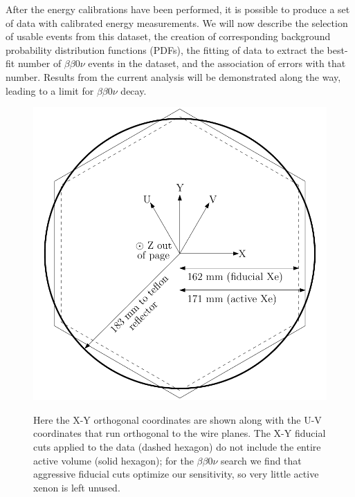 After the energy calibrations have been performed, it is possible to produce a set of data with calibrated energy measurements.  We will now describe the selection of usable events from this dataset, the creation of corresponding background probability distribution functions (PDFs), the fitting of data to extract the best-fit number of $\beta\beta 0\nu$ events in the dataset, and the association of errors with that number.  Results from the current analysis will be demonstrated along the way, leading to a limit for $\beta\beta 0\nu$ decay.

\begin{figure}
\begin{center}
\includegraphics[keepaspectratio=true,width=\textwidth]{FidVolDiagram_Dissertation.pdf}
\end{center}
\renewcommand{\baselinestretch}{1}
\small\normalsize
\begin{quote}
\caption{Here the X-Y orthogonal coordinates are shown along with the U-V coordinates that run orthogonal to the wire planes.  The X-Y fiducial cuts applied to the data (dashed hexagon) do not include the entire active volume (solid hexagon); for the $\beta\beta 0\nu$ search we find that aggressive fiducial cuts optimize our sensitivity, so very little active xenon is left unused.}
\label{fig:FidVolDiagram}
\end{quote}
\end{figure}
\renewcommand{\baselinestretch}{2}
\small\normalsize

